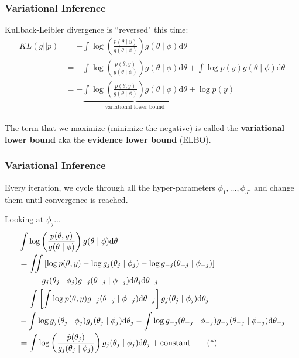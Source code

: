 \documentclass{beamer}
\begin{document}
\begin{frame}[fragile]
\frametitle{Variational Inference}

Kullback-Leibler divergence is ``reversed" this time:
\begin{align*}
KL(g || p) &= - \int \log \left( \frac{ p(\theta \mid y)}{g(\theta \mid \phi)} \right) g(\theta \mid \phi)\text{d}\theta  \\
&= - \int \log \left( \frac{ p(\theta, y)}{g(\theta \mid \phi)} \right) g(\theta \mid \phi)\text{d}\theta
+ \int \log p(y)g(\theta \mid \phi) \text{d}\theta \\
&= - \underbrace{\int \log \left( \frac{ p(\theta, y)}{g(\theta \mid \phi)} \right) g(\theta \mid \phi)\text{d}\theta}_{\text{variational lower bound}}
+  \log p(y) \\
\end{align*}

The term that we maximize (minimize the negative) is called the {\bf variational lower bound} aka the {\bf evidence lower bound} (ELBO).

\end{frame}

\begin{frame}[fragile]
\frametitle{Variational Inference}

Every iteration, we cycle through all the hyper-parameters $\phi_1, \ldots, \phi_J$, and change them until convergence is reached.
\newline
\pause

Looking at $\phi_j$...
\begin{align*}
&\int \log \left( \frac{ p(\theta, y)}{g(\theta \mid \phi)} \right) g(\theta \mid \phi)\text{d}\theta \\
&=  \iint \left[\log p(\theta, y) - \log g_j(\theta_j \mid \phi_j) - \log g_{-j}(\theta_{-j} \mid \phi_{-j})\right]  \\
&\hspace{10mm} g_j(\theta_j \mid \phi_j)g_{-j}(\theta_{-j} \mid \phi_{-j})\text{d}\theta_{j}\text{d}\theta_{-j} \\
&=  \int \left[\int\log p(\theta, y)g_{-j}(\theta_{-j} \mid \phi_{-j}) \text{d}\theta_{-j}\right] g_j(\theta_j \mid \phi_j)\text{d}\theta_{j} \\
&- \int\log g_j(\theta_j \mid \phi_j)g_j(\theta_j \mid \phi_j)\text{d}\theta_j - \int \log g_{-j}(\theta_{-j} \mid \phi_{-j})g_{-j}(\theta_{-j} \mid \phi_{-j})\text{d}\theta_{-j} \\ 
&=  \int  \log \left(\frac{\tilde{p}(\theta_j)}{g_j(\theta_j \mid \phi_j)}  \right) g_j(\theta_j \mid \phi_j)\text{d}\theta_{j} + \text{constant} \tag{*}
\end{align*}

\end{frame}
\end{document}
